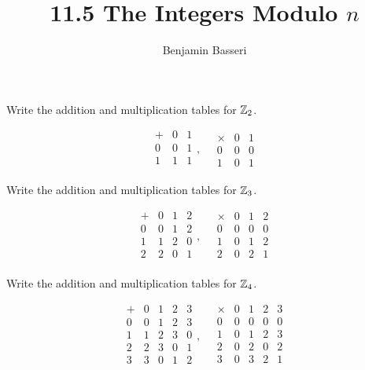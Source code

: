 \documentclass{article}
\title{11.5 The Integers Modulo $n$}
\author{Benjamin Basseri}
\begin{document}
\maketitle

\begin{problem}
Write the addition and multiplication tables for $\mathbb{Z}_2$.
\end{problem}

$$\begin{array}{c|cc}
    + & 0 & 1 \\
    \hline
    0 & 0 & 1 \\
    1 & 1 & 1 \\
  \end{array}, \quad
  \begin{array}{c|cc}
    \times & 0 & 1 \\
    \hline
    0      & 0 & 0 \\
    1      & 0 & 1
  \end{array}$$

\begin{problem}
Write the addition and multiplication tables for $\mathbb{Z}_3$.
\end{problem}

$$\begin{array}{c|ccc}
    + & 0 & 1 & 2 \\
    \hline
    0 & 0 & 1 & 2 \\
    1 & 1 & 2 & 0 \\
    2 & 2 & 0 & 1 \\
  \end{array}, \quad
  \begin{array}{c|ccc}
    \times & 0 & 1 & 2 \\
    \hline
    0      & 0 & 0 & 0 \\
    1      & 0 & 1 & 2 \\
    2      & 0 & 2 & 1 \\
  \end{array}$$

\begin{problem}
Write the addition and multiplication tables for $\mathbb{Z}_4$.
\end{problem}

$$\begin{array}{c|cccc}
    + & 0 & 1 & 2 & 3 \\
    \hline
    0 & 0 & 1 & 2 & 3 \\
    1 & 1 & 2 & 3 & 0 \\
    2 & 2 & 3 & 0 & 1 \\
    3 & 3 & 0 & 1 & 2 \\
  \end{array}, \quad
  \begin{array}{c|cccc}
    \times & 0 & 1 & 2 & 3 \\
    \hline
    0      & 0 & 0 & 0 & 0 \\
    1      & 0 & 1 & 2 & 3 \\
    2      & 0 & 2 & 0 & 2 \\
    3      & 0 & 3 & 2 & 1 \\
  \end{array}$$
\end{document}
